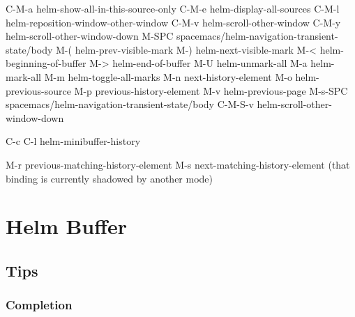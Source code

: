 \documentclass[11pt]{article}
\begin{document}
C-M-a           helm-show-all-in-this-source-only
C-M-e           helm-display-all-sources
C-M-l           helm-reposition-window-other-window
C-M-v           helm-scroll-other-window
C-M-y           helm-scroll-other-window-down
M-SPC           spacemacs/helm-navigation-transient-state/body
M-(             helm-prev-visible-mark
M-)             helm-next-visible-mark
M-<             helm-beginning-of-buffer
M->             helm-end-of-buffer
M-U             helm-unmark-all
M-a             helm-mark-all
M-m             helm-toggle-all-marks
M-n             next-history-element
M-o             helm-previous-source
M-p             previous-history-element
M-v             helm-previous-page
M-s-SPC         spacemacs/helm-navigation-transient-state/body
C-M-S-v         helm-scroll-other-window-down

C-c C-l         helm-minibuffer-history

M-r             previous-matching-history-element
M-s             next-matching-history-element
  (that binding is currently shadowed by another mode)



\section{Helm Buffer}
\label{sec:org88785c2}

\subsection{Tips}
\label{sec:orge733318}

\subsubsection{Completion}
\label{sec:org2ff5d05}
\end{document}
